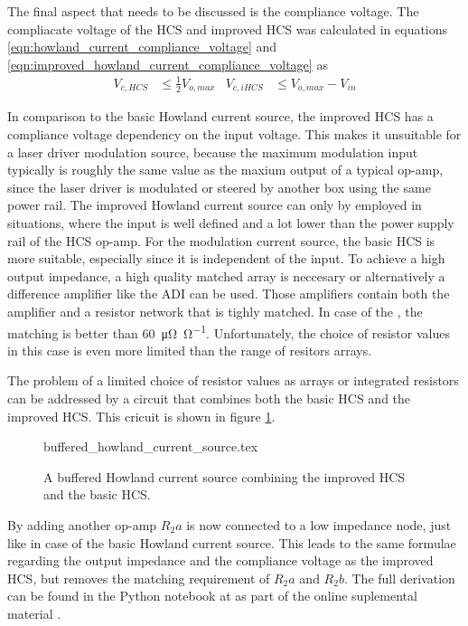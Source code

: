 The final aspect that needs to be discussed is the compliance voltage. The compliacate voltage of the HCS and improved HCS was calculated in equations \ref{eqn:howland_current_compliance_voltage} and \ref{eqn:improved_howland_current_compliance_voltage} as
\begin{align*}
    V_{c, HCS} &\leq \frac{1}{2} V_{o,max} & V_{c, iHCS} &\leq V_{o,max} - V_{in}
\end{align*}

In comparison to the basic Howland current source, the improved HCS has a compliance voltage dependency on the input voltage. This makes it unsuitable for a laser driver modulation source, because the maximum modulation input typically is roughly the same value as the maxium output of a typical op-amp, since the laser driver is modulated or steered by another box using the same power rail. The improved Howland current source can only by employed in situations, where the input is well defined and a lot lower than the power supply rail of the HCS op-amp. For the modulation current source, the basic HCS is more suitable, especially since it is independent of the input. To achieve a high output impedance, a high quality matched array is neccesary or alternatively a difference amplifier like the ADI  \cite{datasheet_LT1997} can be used. Those amplifiers contain both the amplifier and a resistor network that is tighly matched. In case of the , the matching is better than \qty{60}{\micro\ohm \per \ohm}. Unfortunately, the choice of resistor values in this case is even more limited than the range of resitors arrays.

The problem of a limited choice of resistor values as arrays or integrated resistors can be addressed by a circuit that combines both the basic HCS and the improved HCS. This cricuit is shown in figure \ref{fig:buffered_howland_current_source}.
\begin{figure}[hb]
    \centering
        {buffered_howland_current_source.tex}
    \caption{A buffered Howland current source combining the improved HCS and the basic HCS.}
    \label{fig:buffered_howland_current_source}
\end{figure}

By adding another op-amp $R_2a$ is now connected to a low impedance node, just like in case of the basic Howland current source. This leads to the same formulae regarding the output impedance and the compliance voltage as the improved HCS, but removes the matching requirement of $R_2a$ and $R_2b$. The full derivation can be found in the Python notebook at  as part of the online suplemental material \cite{supplemental_material}.

